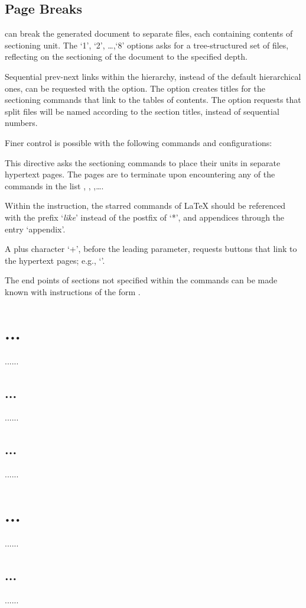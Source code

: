 \section{Page Breaks}

\texfourht{} can break the generated document to separate files, each containing 
contents of sectioning unit. The ‘1’, ‘2’, \ldots ,‘8’ options asks for a
tree-structured set of files, reflecting on the sectioning of the document to
the specified depth. 

Sequential prev-next links within the hierarchy, instead
of the default hierarchical ones, can be requested with the  option.
The option  creates titles for the sectioning commands that link
to the tables of contents. The  option requests that split  files will
be named according to the section titles, instead of sequential numbers.

Finer control is possible with the following commands and configurations:



This directive asks the sectioning commands  to place their units in
separate hypertext pages. The pages are to terminate upon encountering any of
the commands in the list , , ,\ldots.

Within the  instruction, the starred commands of \LaTeX{} should be
referenced with the prefix ‘\textit{like}’ instead of the postfix of ‘*’, and appendices
through the entry ‘appendix’.

A plus character ‘+’, before the leading parameter, requests buttons that link
to the hypertext pages; e.g., ‘’. 


The end points of sections not specified within the  commands can be made
known with instructions of the form . 

\begin{texsource}
\tableofcontents
\chapter{...}  ......  \section{...}  ......  \section{...}  ......
\chapter{...}  ......  \section{...}  ......
\end{texsource}

